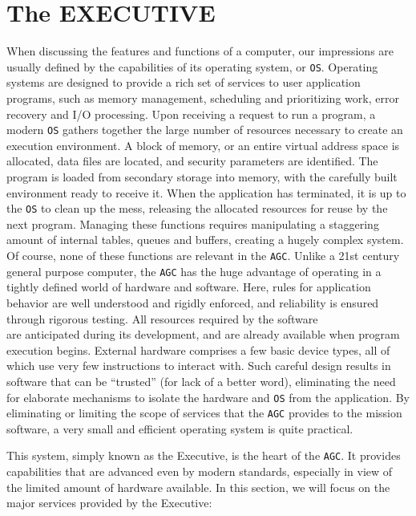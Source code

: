 \documentclass[refcap, oxford]{ahsan}
\begin{document}
\section{The EXECUTIVE}

When discussing the features and functions of a computer, our impressions are usually defined by the capabilities of its operating system, or \texttt{OS}. Operating systems are designed to provide a rich set of services to user application programs, such as memory management, scheduling and prioritizing work, error recovery and I/O processing. Upon receiving a request to run a program, a modern \texttt{OS} gathers together the large number of resources necessary to create an execution environment. A block of memory, or an entire virtual address space is allocated, data files are located, and security parameters are identified. The program is loaded from secondary storage into memory, with the carefully built environment ready to receive it. When the application has terminated, it is up to the \texttt{OS} to clean up the mess, releasing the allocated resources for reuse by the next program. Managing these functions requires manipulating a staggering amount of internal tables, queues and buffers, creating a hugely complex system. Of course, none of these functions are relevant in the \texttt{AGC}. Unlike a 21st century general purpose computer, the \texttt{AGC} has the huge advantage of operating in a tightly defined world of hardware and software. Here, rules for application behavior are well understood and rigidly enforced, and reliability is ensured through rigorous testing. All resources required by the software\\
are anticipated during its development, and are already available when program execution begins. External hardware comprises a few basic device types, all of which use very few instructions to interact with. Such careful design results in software that can be ``trusted'' (for lack of a better word), eliminating the need for elaborate mechanisms to isolate the hardware and \texttt{OS} from the application. By eliminating or limiting the scope of services that the \texttt{AGC} provides to the mission software, a very small and efficient operating system is quite practical.

This system, simply known as the Executive, is the heart of the \texttt{AGC}. It provides capabilities that are advanced even by modern standards, especially in view of the limited amount of hardware available. In this section, we will focus on the major services provided by the Executive:
\end{document}

